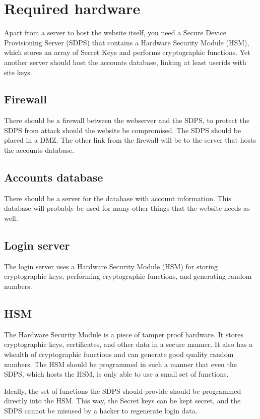 \section{Required hardware}
Apart from a server to host the website itself,
you need a Secure Device Provisioning Server (SDPS)
that contains a Hardware Security Module (HSM),
which stores an array of Secret Keys and performs cryptographic functions.
Yet another server should host the accounts database, linking at least userids with site keys.

\subsection{Firewall}
There should be a firewall between the webserver and the SDPS,
to protect the SDPS from attack should the website be compromised.
The SDPS should be placed in a DMZ.
The other link from the firewall will be to the server that hosts the accounts database.

\subsection{Accounts database}
There should be a server for the database with account information.
This database will probably be used for many other things that the website needs as well.

\subsection{Login server}
\label{sec:login_server}
The login server uses a Hardware Security Module (HSM)
for storing cryptographic keys, performing cryptographic functions, and generating random numbers.

\subsection{HSM}
The Hardware Security Module is a piece of tamper proof hardware.
It stores cryptographic keys, certificates, and other data in a secure manner.
It also has a whealth of cryptographic functions and can generate good quality random numbers.
The HSM should be programmed in such a manner that even the SDPS, which hosts the HSM, is only able to use a small set of functions.
\par
Ideally, the set of functions the SDPS should provide should be programmed directly into the HSM.
This way, the Secret keys can be kept secret, and the SDPS cannot be misused by a hacker to regenerate login data.
